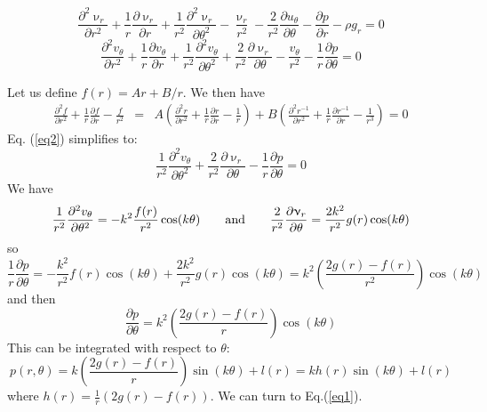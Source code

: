 \begin{equation}
\frac{\partial^2 \upnu_r}{\partial r^2} + \frac{1}{r} \frac{\partial \upnu_r}{\partial r} 
+ \frac{1}{r^2} \frac{\partial^2 \upnu_r}{\partial \theta^2}
- \frac{\upnu_r}{r^2} - \frac{2}{r^2} \frac{\partial u_\theta}{\partial \theta} 
-\frac{\partial p}{\partial r} - \rho g_r = 0
\label{eq1}
\end{equation}
\begin{equation}
\frac{\partial^2 v_\theta}{\partial r^2} + \frac{1}{r} \frac{\partial v_\theta}{\partial r} + \frac{1}{r^2} \frac{\partial^2 v_\theta}{\partial \theta^2}
+\frac{2}{r^2} \frac{\partial \upnu_r}{\partial \theta} - \frac{v_\theta}{r^2} 
-\frac{1}{r}\frac{\partial p}{\partial \theta} = 0
\label{eq2}
\end{equation}

Let us define $f(r)= Ar+B/r$. We then have 
\begin{eqnarray}
 \frac{\partial^2 f}{\partial r^2} + \frac{1}{r} \frac{\partial f}{\partial r} - \frac{f}{r^2} 
&=& A \left( \frac{\partial^2 r}{\partial r^2} + \frac{1}{r} \frac{\partial r}{\partial r} - \frac{1}{r}\right) 
  + B \left(\frac{\partial^2 r^{-1}}{\partial r^2} + \frac{1}{r} \frac{\partial r^{-1}}{\partial r}  - \frac{1}{r^3}\right) =0
\end{eqnarray}
Eq. (\ref{eq2}) simplifies to:
\[
\frac{1}{r^2} \frac{\partial^2 v_\theta}{\partial \theta^2}
+\frac{2}{r^2} \frac{\partial \upnu_r}{\partial \theta} 
-\frac{1}{r}\frac{\partial p}{\partial \theta} = 0
\]
We have 
\[
\frac{1}{r^2} \frac{\partial^2 v_\theta}{\partial \theta^2}
=
-k^2\frac{f(r)}{r^2} \cos (k \theta)  %
\quad\quad {\rm and} \quad\quad
\frac{2}{r^2} \frac{\partial \upnu_r}{\partial \theta} 
=
\frac{2k^2}{r^2} g(r)  \cos(k \theta) 
\]
so 
\[
\frac{1}{r}
\frac{\partial p}{\partial \theta} = 
-\frac{k^2}{r^2}f(r) \cos (k \theta) 
+ 
\frac{2k^2}{r^2} g(r)  \cos(k \theta) 
= k^2\left(  \frac{2g(r)-f(r)}{r^2} \right) \cos(k \theta)
\]
and then 
\[
\frac{\partial p}{\partial \theta} = 
 k^2\left(  \frac{2g(r)-f(r)}{r} \right) \cos(k \theta)
\]
This can be integrated with respect to $\theta$:
\[
p(r,\theta)= k\left(  \frac{2g(r)-f(r)}{r} \right) \sin(k \theta) +  l(r)
= k h(r) \sin(k \theta) + l(r)
\]
where $h(r) = \frac{1}{r}(2g(r)-f(r))$.
We can turn to Eq.(\ref{eq1}). 
